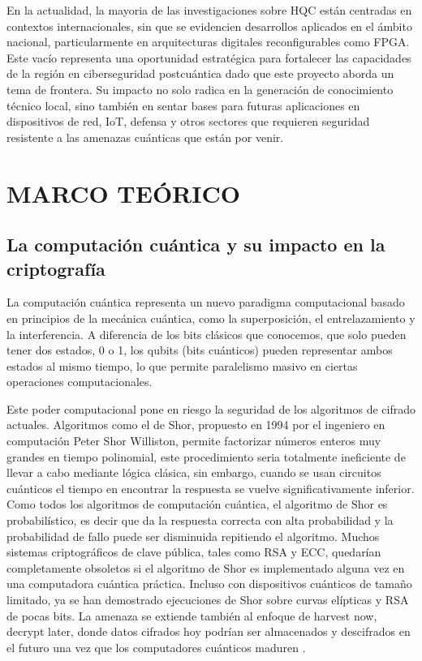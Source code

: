 En la actualidad, la mayoria de las investigaciones sobre HQC están centradas en contextos internacionales, sin que se evidencien desarrollos aplicados en el ámbito nacional, particularmente en arquitecturas digitales reconfigurables como FPGA. Este vacío representa una oportunidad estratégica para fortalecer las capacidades de la región en ciberseguridad postcuántica dado que este proyecto aborda un tema de frontera. Su impacto no solo radica en la generación de conocimiento técnico local, sino también en sentar bases para futuras aplicaciones en dispositivos de red, IoT, defensa y otros sectores que requieren seguridad resistente a las amenazas cuánticas que están por venir.



\chapter{MARCO TEÓRICO}
\section{La computación cuántica y su impacto en la criptografía}
La computación cuántica representa un nuevo paradigma computacional basado en principios de la mecánica cuántica, como la superposición, el entrelazamiento y la interferencia. A diferencia de los bits clásicos que conocemos, que solo pueden tener dos estados, 0 o 1, los qubits (bits cuánticos) pueden representar ambos estados al mismo tiempo, lo que permite paralelismo masivo en ciertas operaciones computacionales.

Este poder computacional pone en riesgo la seguridad de los algoritmos de cifrado actuales. Algoritmos como el de Shor, propuesto en 1994 por el ingeniero en computación Peter Shor Williston, permite factorizar números enteros muy grandes en tiempo polinomial, este procedimiento seria totalmente ineficiente de llevar a cabo mediante lógica clásica, sin embargo, cuando se usan circuitos cuánticos el tiempo en encontrar la respuesta se vuelve significativamente inferior. Como todos los algoritmos de computación cuántica, el algoritmo de Shor es probabilístico, es decir que da la respuesta correcta con alta probabilidad y la probabilidad de fallo puede ser disminuida repitiendo el algoritmo. Muchos sistemas criptográficos de clave pública, tales como RSA y ECC, quedarían completamente obsoletos si el algoritmo de Shor es implementado alguna vez en una computadora cuántica práctica. Incluso con dispositivos cuánticos de tamaño limitado, ya se han demostrado ejecuciones de Shor sobre curvas elípticas y RSA de pocas bits. La amenaza se extiende también al enfoque de harvest now, decrypt later, donde datos cifrados hoy podrían ser almacenados y descifrados en el futuro una vez que los computadores cuánticos maduren \cite{Olutimehin2025FutureProofing}.

